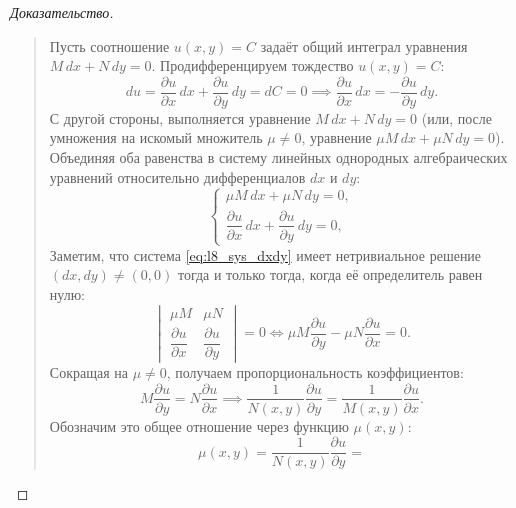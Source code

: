 \begin{proof}[Доказательство]~\\
    \begin{quote}
        Пусть соотношение $u(x, y) = C$ задаёт общий интеграл уравнения
        $M \, dx + N \, dy = 0$. Продифференцируем тождество $u(x, y) = C$:
        \[
            du = \frac{\partial u}{\partial x} \, dx +
            \frac{\partial u}{\partial y} \, dy = dC = 0 \implies
            \frac{\partial u}{\partial x} \, dx =
            -\frac{\partial u}{\partial y} \, dy.
        \]
        С другой стороны, выполняется
        уравнение $M \, dx + N \, dy = 0$ (или, после умножения на искомый
        множитель $\mu \neq 0$, уравнение $\mu M \, dx + \mu N \, dy = 0$).
        Объединяя оба равенства в систему линейных однородных алгебраических
        уравнений относительно дифференциалов $dx$ и $dy$:
        \begin{equation} \label{eq:l8_sys_dxdy}
            \begin{cases}
                \mu M \, dx + \mu N \, dy = 0, \\[1mm]
                \dfrac{\partial u}{\partial x} \, dx +
                \dfrac{\partial u}{\partial y} \, dy = 0,
            \end{cases} \tag{5}
        \end{equation}
        Заметим, что система \eqref{eq:l8_sys_dxdy} имеет нетривиальное
        решение $(dx, dy) \neq (0, 0)$ тогда и только тогда, когда её
        определитель равен нулю:
        \begin{equation} \label{eq:l8_det_zero}
            \begin{vmatrix}
                \mu M & \mu N \\[2mm]
                \dfrac{\partial u}{\partial x} & \dfrac{\partial u}{\partial y}
            \end{vmatrix} = 0 \iff
            \mu M \frac{\partial u}{\partial y} -
            \mu N \frac{\partial u}{\partial x} = 0. \tag{6}
        \end{equation}
        Сокращая на $\mu \neq 0$, получаем пропорциональность коэффициентов:
        \[
            M \frac{\partial u}{\partial y} = N \frac{\partial u}{\partial x}
            \implies \frac{1}{N(x, y)} \frac{\partial u}{\partial y} =
            \frac{1}{M(x, y)} \frac{\partial u}{\partial x}.
        \]
        Обозначим это общее отношение через функцию $\mu(x, y)$:
        \begin{equation} \label{eq:l8_mu_explicit}
            \mu(x, y) = \frac{1}{N(x, y)} \frac{\partial u}{\partial y} =

\end{equation}
\end{quote}
\end{proof}
